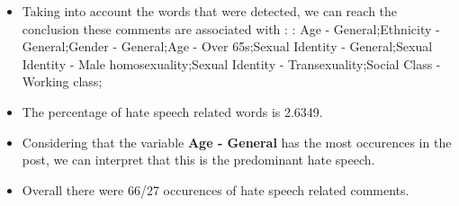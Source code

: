 \documentclass[11pt]{article}
\begin{document}
\begin{itemize}\item Taking into account the words that were detected, we can reach the conclusion these comments are associated with : : Age - General;Ethnicity - General;Gender - General;Age - Over 65s;Sexual Identity - General;Sexual Identity - Male homosexuality;Sexual Identity - Transexuality;Social Class - Working class;%

\item The percentage of hate speech related words is 2.6349.

\item Considering that the variable \textbf{Age - General} has the most occurences in the post, we can interpret that this is the predominant hate speech.

\item Overall there were 66/27 occurences of hate speech related comments.\end{itemize}
\end{document}
